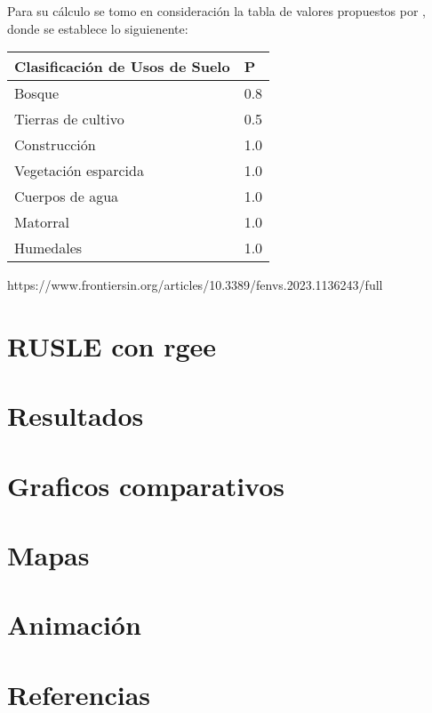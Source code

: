 \documentclass[
  letterpaper,
  DIV=11,
  numbers=noendperiod]{scrreprt}
\newlength{\cslhangindent}
\newlength{\cslentryspacingunit} %
\newenvironment{CSLReferences}[2] %
 {%
  \setlength{\parindent}{0pt}
  \ifodd #1
  \let\oldpar\par
  \def\par{\hangindent=\cslhangindent\oldpar}
  \fi
  \setlength{\parskip}{#2\cslentryspacingunit}
 }%
 {}
\begin{document}
Para su cálculo se tomo en consideración la tabla de valores propuestos
por , donde se establece lo siguienente:

\begin{longtable}[]{@{}ll@{}}
\toprule\noalign{}
Clasificación de Usos de Suelo & P \\
\midrule\noalign{}
\endhead
\bottomrule\noalign{}
\endlastfoot
Bosque & 0.8 \\
Tierras de cultivo & 0.5 \\
Construcción & 1.0 \\
Vegetación esparcida & 1.0 \\
Cuerpos de agua & 1.0 \\
Matorral & 1.0 \\
Humedales & 1.0 \\
\end{longtable}

https://www.frontiersin.org/articles/10.3389/fenvs.2023.1136243/full


\hypertarget{rusle-con-rgee}{%
\chapter{RUSLE con rgee}\label{rusle-con-rgee}}


\hypertarget{resultados}{%
\chapter{Resultados}\label{resultados}}


\hypertarget{graficos-comparativos}{%
\chapter{Graficos comparativos}\label{graficos-comparativos}}


\hypertarget{mapas}{%
\chapter{Mapas}\label{mapas}}


\hypertarget{animaciuxf3n}{%
\chapter{Animación}\label{animaciuxf3n}}


\hypertarget{referencias}{%
\chapter*{Referencias}\label{referencias}}


\hypertarget{refs}{}
\begin{CSLReferences}{0}{0}
\end{CSLReferences}
\end{document}
